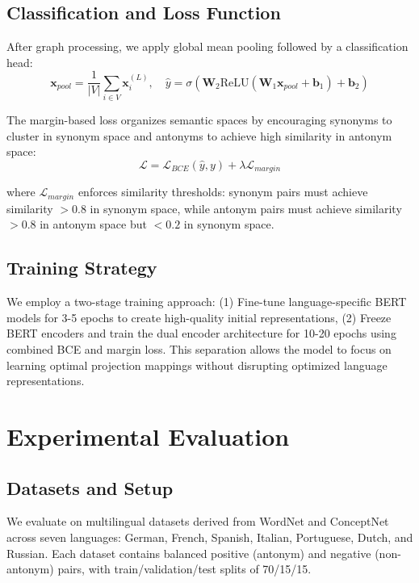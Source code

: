 \documentclass[11pt]{article}
\begin{document}
\subsection{Classification and Loss Function}
After graph processing, we apply global mean pooling followed by a classification head:
\begin{equation}
\mathbf{x}_{pool} = \frac{1}{|V|}\sum_{i \in V} \mathbf{x}_i^{(L)}, \quad \hat{y} = \sigma(\mathbf{W}_2\text{ReLU}(\mathbf{W}_1\mathbf{x}_{pool} + \mathbf{b}_1) + \mathbf{b}_2)
\end{equation}

The margin-based loss organizes semantic spaces by encouraging synonyms to cluster in synonym space and antonyms to achieve high similarity in antonym space:
\begin{equation}
\mathcal{L} = \mathcal{L}_{BCE}(\hat{y}, y) + \lambda \mathcal{L}_{margin}
\end{equation}

where $\mathcal{L}_{margin}$ enforces similarity thresholds: synonym pairs must achieve similarity $> 0.8$ in synonym space, while antonym pairs must achieve similarity $> 0.8$ in antonym space but $< 0.2$ in synonym space.

\subsection{Training Strategy}
We employ a two-stage training approach: (1) Fine-tune language-specific BERT models for 3-5 epochs to create high-quality initial representations, (2) Freeze BERT encoders and train the dual encoder architecture for 10-20 epochs using combined BCE and margin loss. This separation allows the model to focus on learning optimal projection mappings without disrupting optimized language representations.

\section{Experimental Evaluation}

\subsection{Datasets and Setup}
We evaluate on multilingual datasets derived from WordNet and ConceptNet across seven languages: German, French, Spanish, Italian, Portuguese, Dutch, and Russian. Each dataset contains balanced positive (antonym) and negative (non-antonym) pairs, with train/validation/test splits of 70/15/15.
\end{document}
